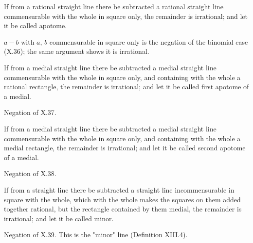 \documentclass{rrxiv}
\begin{document}
\begin{claim}
\label{prop:X.73}
If from a rational straight line there be subtracted a rational
straight line commensurable with the whole in square only, the
remainder is irrational; and let it be called apotome.
\end{claim}
\begin{evidence}[Proof of X.73]
\label{ev:X.73}
$a - b$ with $a$, $b$ commensurable in square only is the negation
of the binomial case (X.36); the same argument shows it is
irrational.
\end{evidence}

\begin{claim}
\label{prop:X.74}
If from a medial straight line there be subtracted a medial straight
line commensurable with the whole in square only, and containing
with the whole a rational rectangle, the remainder is irrational;
and let it be called first apotome of a medial.
\end{claim}
\begin{evidence}[Proof of X.74]
\label{ev:X.74}
Negation of X.37.
\end{evidence}

\begin{claim}
\label{prop:X.75}
If from a medial straight line there be subtracted a medial straight
line commensurable with the whole in square only, and containing
with the whole a medial rectangle, the remainder is irrational; and
let it be called second apotome of a medial.
\end{claim}
\begin{evidence}[Proof of X.75]
\label{ev:X.75}
Negation of X.38.
\end{evidence}

\begin{claim}
\label{prop:X.76}
If from a straight line there be subtracted a straight line
incommensurable in square with the whole, which with the whole makes
the squares on them added together rational, but the rectangle
contained by them medial, the remainder is irrational; and let it
be called minor.
\end{claim}
\begin{evidence}[Proof of X.76]
\label{ev:X.76}
Negation of X.39.  This is the "minor" line (Definition XIII.4).
\end{evidence}
\end{document}

